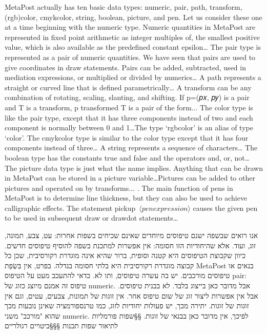 {MetaPost actually has ten basic data types: numeric, pair, path, transform, (rgb)color, cmykcolor, string, boolean, picture, and pen. Let us consider these one at a time beginning with the numeric type.
Numeric quantities in MetaPost are represented in fixed point arithmetic as integer multiples of, the smallest positive value, which is also available as the predefined constant epsilon…
The pair type is represented as a pair of numeric quantities. We have seen that pairs are used to give coordinates in draw statements. Pairs can be added, subtracted, used in mediation expressions, or multiplied or divided by numerics…
A path represents a straight or curved line that is defined parametrically…
A transform can be any combination of rotating, scaling, slanting, and shifting. If p=(𝑝𝑥, 𝑝𝑦) is a pair and T is a transform,
p transformed T
is a pair of the form...
The color type is like the pair type, except that it has three components instead of two and each component is normally between 0 and 1…The type ‘rgbcolor’ is an alias of type ‘color’.
The cmykcolor type is similar to the color type except that it has four components instead of three…
A string represents a sequence of characters…
The boolean type has the constants true and false and the operators and, or, not…
The picture data type is just what the name implies. Anything that can be drawn in MetaPost can be stored in a picture variable…Pictures can be added to other pictures and operated on by transforms...
. The main function of pens in MetaPost is to determine line thickness, but they can also be used to achieve calligraphic effects. The statement pickup~$⟨{pen expression}⟩$ causes the given pen to be used in subsequent draw or drawdot statements…

אנו רואים שבשפה ישנם טיפוסים מיוחדים שאינם שכיחים בשפות אחרות: עט, צבע,
תמונה, זוג, ועוד. אלא שהיחודיות הזו חסומה: אין אפשרות למתכנת בשפה להוסיף
טיפוסים חדשים. כיוון שקבוצת הטיפוסים היא קטנה וסופית, ברור שהיא אינה
מוגדרת רקורסיבית, שכן כל קבוצה מוגדרת רקורסיבית היא בלתי חסומה בגדלה.
בפרט, אין בִּשְׂפַת MetaPost בנאים או טיפוסים מורכבים. יש בה עשרה טיפוסים, ותו
לא. כדאי להתעכב מעט על הטיפוס pair: טיפוס זה אמנם מיוצג כזוג של numeric.
אבל מדובר כאן בייצוג בלבד. לא בבנית טיפוסים. אבל אין אפשרות ליצור זוג של
שום טיפוס אחר. אין זוגות של תמונות, צבעים, עטים, וגם אין זוגות של זוגות.
יתירה מכך, יש פעולות יחודיות לזוג, כמו טרנספורמציה שאינן נובעות מכך שהוא
"מורכב" משני numeric. לפיכך, אין מדובר כאן בבנאי של זוגות.
§§שפות פורמליות לתיאור שפות תכנות
§§§ביטויים רגולריים

}

